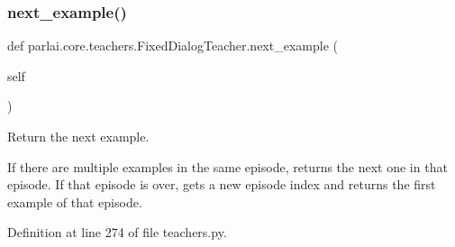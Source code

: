 \subsubsection{\texorpdfstring{next\+\_\+example()}{next\_example()}}
{\footnotesize\ttfamily def parlai.\+core.\+teachers.\+Fixed\+Dialog\+Teacher.\+next\+\_\+example (\begin{DoxyParamCaption}\item[{}]{self }\end{DoxyParamCaption})}

\begin{DoxyVerb}Return the next example.

If there are multiple examples in the same episode, returns the next one in that
episode. If that episode is over, gets a new episode index and returns the first
example of that episode.
\end{DoxyVerb}
 

Definition at line 274 of file teachers.\+py.


